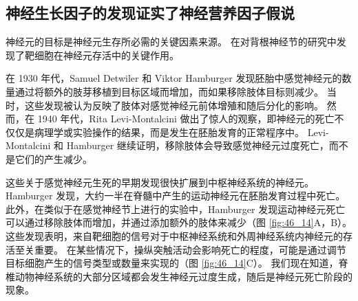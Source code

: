 \subsection{神经生长因子的发现证实了神经营养因子假说}
神经元的目标是神经元生存所必需的关键因素来源。 在对背根神经节的研究中发现了靶细胞在神经元存活中的关键作用。

在 1930 年代，Samuel Detwiler 和 Viktor Hamburger 发现胚胎中感觉神经元的数量通过将额外的肢芽移植到目标区域而增加，而如果移除肢体目标则减少。 当时，这些发现被认为反映了肢体对感觉神经元前体增殖和随后分化的影响。 然而，在 1940 年代，Rita Levi-Montalcini 做出了惊人的观察，即神经元的死亡不仅仅是病理学或实验操作的结果，而是发生在胚胎发育的正常程序中。 Levi-Montalcini 和 Hamburger 继续证明，移除肢体会导致感觉神经元过度死亡，而不是它们的产生减少。

这些关于感觉神经元生死的早期发现很快扩展到中枢神经系统的神经元。 Hamburger 发现，大约一半在脊髓中产生的运动神经元在胚胎发育过程中死亡。 此外，在类似于在感觉神经节上进行的实验中，Hamburger 发现运动神经元死亡可以通过移除肢体而增加，并通过添加额外的肢体来减少（图 \ref{fig:46_14}A，B）。 这些发现表明，来自靶细胞的信号对于中枢神经系统和外周神经系统内神经元的存活至关重要。 在某些情况下，操纵突触活动会影响死亡的程度，可能是通过调节目标细胞产生的信号类型或数量来实现的（图 \ref{fig:46_14}C）。 我们现在知道，脊椎动物神经系统的大部分区域都会发生神经元过度生成，随后是神经元死亡阶段的现象。

